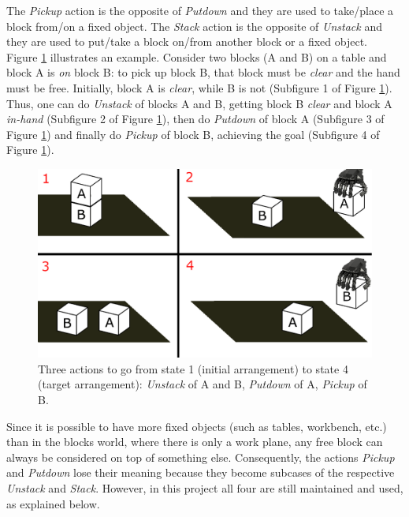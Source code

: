 The \textit{Pickup} action is the opposite of \textit{Putdown} and they are used to take/place a block from/on a fixed object. The \textit{Stack} action is the opposite of \textit{Unstack} and they are used to put/take a block on/from another block or a fixed object. \\
Figure \ref{fig:blocks_example} illustrates an example. Consider two blocks (A and B) on a table and block A is \textit{on} block B: to pick up block B, that block must be \textit{clear} and the hand must be free. Initially, block A is \textit{clear}, while B is not (Subfigure 1 of Figure \ref{fig:blocks_example}). Thus, one can do \textit{Unstack} of blocks A and B, getting block B \textit{clear} and block A \textit{in-hand} (Subfigure 2 of Figure \ref{fig:blocks_example}), then do \textit{Putdown} of block A (Subfigure 3 of Figure \ref{fig:blocks_example}) and finally do \textit{Pickup} of block B, achieving the goal (Subfigure 4 of Figure \ref{fig:blocks_example}).

\begin{figure} [h]
\centering
\includegraphics[width=0.9
\textwidth]{figures/Magistrale/blocks_example}
\caption[Blocks world example]{Three actions to go from state 1 (initial arrangement) to state 4 (target arrangement): \textit{Unstack} of A and B, \textit{Putdown} of A, \textit{Pickup} of B. 
\label{fig:blocks_example}}
\end{figure} 

Since it is possible to have more fixed objects (such as tables, workbench, etc.) than in the blocks world, where there is only a work plane, any free block can always be considered on top of something else. Consequently, the actions \textit{Pickup} and \textit{Putdown} lose their meaning because they become subcases of the respective \textit{Unstack} and \textit{Stack}. However, in this project all four are still maintained and used, as explained below. 


